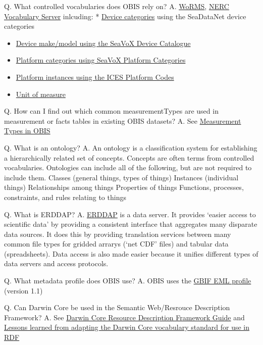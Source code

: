 \documentclass[
]{book}
\begin{document}
Q. What controlled vocabularies does OBIS rely on?
A. \href{https://www.marinespecies.org/}{WoRMS}, \href{http://vocab.nerc.ac.uk/}{NERC Vocabulary Server} inlcuding:
* \href{http://vocab.nerc.ac.uk/collection/L05/current/}{Device categories} using the SeaDataNet device categories

\begin{itemize}
\item
  \href{http://vocab.nerc.ac.uk/collection/L22/current/}{Device make/model using the SeaVoX Device Catalogue}
\item
  \href{http://vocab.nerc.ac.uk/collection/L06/current/}{Platform categories using SeaVoX Platform Categories}
\item
  \href{http://vocab.nerc.ac.uk/collection/C17/current/}{Platform instances using the ICES Platform Codes}
\item
  \href{http://vocab.nerc.ac.uk/collection/P06/current/}{Unit of measure}
\end{itemize}

Q. How can I find out which common measurementTypes are used in measurement or facts tables in existing OBIS datasets?
A. See \href{https://mof.obis.org/}{Measurement Types in OBIS}

Q. What is an ontology?
A. An ontology is a classification system for establishing a hierarchically related set of concepts. Concepts are often terms from controlled vocabularies. Ontologies can include all of the following, but are not required to include them.
Classes (general things, types of things)
Instances (individual things)
Relationships among things
Properties of things
Functions, processes, constraints, and rules relating to things

Q. What is ERDDAP?
A. \href{https://coastwatch.pfeg.noaa.gov/erddap/index.html}{ERDDAP} is a data server. It provides `easier access to scientific data' by providing a consistent interface that aggregates many disparate data sources. It does this by providing translation services between many common file types for gridded arrarys (`net CDF' files) and tabular data (spreadsheets). Data access is also made easier because it unifies different types of data servers and access protocols.

Q. What metadata profile does OBIS use?
A. OBIS uses the \href{http://rs.gbif.org/schema/eml-gbif-profile/1.1/eml-gbif-profile.xsd}{GBIF EML profile} (version 1.1)

Q. Can Darwin Core be used in the Semantic Web/Resrouce Description Framework?
A. See \href{https://dwc.tdwg.org/rdf/}{Darwin Core Resource Description Framework Guide} and
\href{http://www.semantic-web-journal.net/system/files/swj1093.pdf}{Lessons learned from adapting the Darwin Core vocabulary standard for use in RDF}
\end{document}
